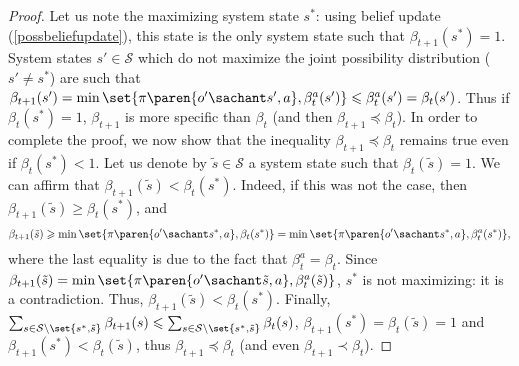 \begin{proof}
Let us note the maximizing system state $s^*$:
using belief update (\ref{possbeliefupdate}),
this state is the only system state such that $\beta_{t+1}(s^*)=1$.
System states $s' \in \mathcal{S}$ 
which do not maximize the joint possibility distribution
($s' \neq s^*$)
 are such that
$ \beta_{t+1}(s') = \min \set{ \pi \paren{ o' \sachant s',a }, \beta^a_t(s')} \leqslant \beta^a_t(s')=\beta_t(s')$.
Thus if $\beta_t(s^*) = 1$, $\beta_{t+1}$ is more specific than $\beta_t$
(and then $\beta_{t+1} \preceq \beta_t$).
In order to complete the proof, we now show that 
the inequality $\beta_{t+1} \preceq \beta_t$ remains true 
even if $\beta_t(s^*) < 1$.
Let us denote by $\tilde{s} \in \mathcal{S}$
a system state such that $\beta_t(\tilde{s}) = 1$.
We can affirm that $\beta_{t+1}(\tilde{s}) < \beta_t(s^*)$.
Indeed, if this was not the case,
then $\beta_{t+1}(\tilde{s}) \geqslant \beta_t(s^*)$,
and 
\[ \beta_{t+1}(\tilde{s}) \geqslant \min \set{ \pi \paren{o' \sachant s^*,a}, \beta_t(s^*)}
=\min \set{ \pi \paren{o' \sachant s^*,a}, \beta^a_t(s^*)},\]
where the last equality is due to the fact that $\beta^a_t=\beta_t$.
Since $\beta_{t+1}(\tilde{s}) = \min \set{ \pi \paren{o' \sachant \tilde{s},a}, \beta^a_t(\tilde{s})}$, $s^*$ is not maximizing: it is a contradiction.
Thus, $\beta_{t+1}(\tilde{s}) < \beta_t(s^*)$.
Finally, $\sum_{s \in \mathcal{S} \setminus \set{s^*,\tilde{s}}} \beta_{t+1}(s) \leqslant \sum_{s \in \mathcal{S} \setminus \set{s^*,\tilde{s}}} \beta_t(s)$, $\beta_{t+1}(s^*) = \beta_t(\tilde{s}) = 1$
and $\beta_{t+1}(s^*)< \beta_t(\tilde{s})$,
thus $\beta_{t+1} \preceq \beta_t$ (and even $\beta_{t+1} \prec \beta_t$).
\end{proof} 

\newpage
